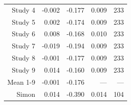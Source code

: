 \begin{table}[!h]
{\begin{tabular}[t]{rrrrr}
\hspace{1em}Study 4 & -0.002 & -0.177 & 0.009 & 233\\
\hspace{1em}Study 5 & 0.002 & -0.174 & 0.009 & 233\\
\hspace{1em}Study 6 & 0.008 & -0.168 & 0.010 & 233\\
\hspace{1em}Study 7 & -0.019 & -0.194 & 0.009 & 233\\
\hspace{1em}Study 8 & -0.001 & -0.177 & 0.009 & 233\\
\hspace{1em}Study 9 & 0.014 & -0.160 & 0.009 & 233\\
\hspace{1em}Mean 1-9 & -0.001 & -0.176 & --- & ---\\
\hspace{1em}Simon & 0.014 & -0.390 & 0.014 & 104\\
\bottomrule
\end{tabular}}
\end{table}
